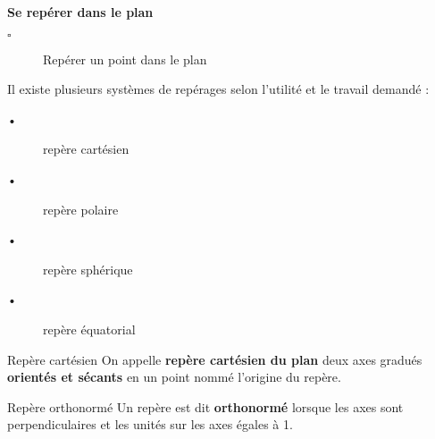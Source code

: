 \begin{titre}

\end{titre}

\begin{CpsCol}
\textbf{Se repérer dans le plan}
\begin{description}
\item[$\square$] Repérer un point dans le plan
\end{description}
\end{CpsCol}



\begin{Rq}
Il existe plusieurs systèmes de repérages selon l'utilité et le travail demandé : 
\begin{description}
 \item[•] repère cartésien
 \item[•] repère polaire
 \item[•] repère sphérique
 \item[•] repère équatorial
 \end{description} 
\end{Rq}


\begin{DefT}{Repère cartésien}
On appelle \textbf{repère cartésien du plan} deux axes gradués \textbf{orientés et sécants} en un point nommé l'origine du repère.
\end{DefT}


\begin{DefT}{Repère orthonormé}
Un repère est dit \textbf{orthonormé} lorsque les axes sont perpendiculaires et les unités sur les axes égales à 1.
\end{DefT}